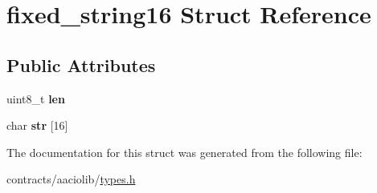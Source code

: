 \hypertarget{structfixed__string16}{}\section{fixed\+\_\+string16 Struct Reference}
\label{structfixed__string16}
\subsection*{Public Attributes}
\begin{DoxyCompactItemize}
\item 
\mbox{\label{structfixed__string16_a8eec9f81e469ac9108eac24ce0bd2c4c}} 
uint8\+\_\+t {\bfseries len}
\item 
\mbox{\label{structfixed__string16_af4fbeb30c27826fab71be2a81d11eaeb}} 
char {\bfseries str} \mbox{[}16\mbox{]}
\end{DoxyCompactItemize}


The documentation for this struct was generated from the following file\+:\begin{DoxyCompactItemize}
\item 
contracts/aaciolib/\mbox{\hyperlink{contracts_2aaciolib_2types_8h}{types.\+h}}\end{DoxyCompactItemize}
